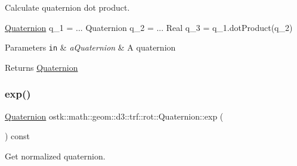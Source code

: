 Calculate quaternion dot product. 


\begin{DoxyCode}
\hyperlink{classostk_1_1math_1_1geom_1_1d3_1_1trf_1_1rot_1_1_quaternion_ad9fd7d8eb5effb4d4e0394bbb5bb86dc}{Quaternion} q\_1 = ...
Quaternion q\_2 = ...
Real q\_3 = q\_1.dotProduct(q\_2)
\end{DoxyCode}



\begin{DoxyParams}[1]{Parameters}
\mbox{\tt in}  & {\em a\+Quaternion} & A quaternion \\
\hline
\end{DoxyParams}
\begin{DoxyReturn}{Returns}
\hyperlink{classostk_1_1math_1_1geom_1_1d3_1_1trf_1_1rot_1_1_quaternion}{Quaternion} 
\end{DoxyReturn}
\mbox{\label{classostk_1_1math_1_1geom_1_1d3_1_1trf_1_1rot_1_1_quaternion_ab52abec08a04aa42646b2f418b7ba964}} 
\subsubsection{\texorpdfstring{exp()}{exp()}}
{\footnotesize\ttfamily \hyperlink{classostk_1_1math_1_1geom_1_1d3_1_1trf_1_1rot_1_1_quaternion}{Quaternion} ostk\+::math\+::geom\+::d3\+::trf\+::rot\+::\+Quaternion\+::exp (\begin{DoxyParamCaption}{ }\end{DoxyParamCaption}) const}



Get normalized quaternion. 


